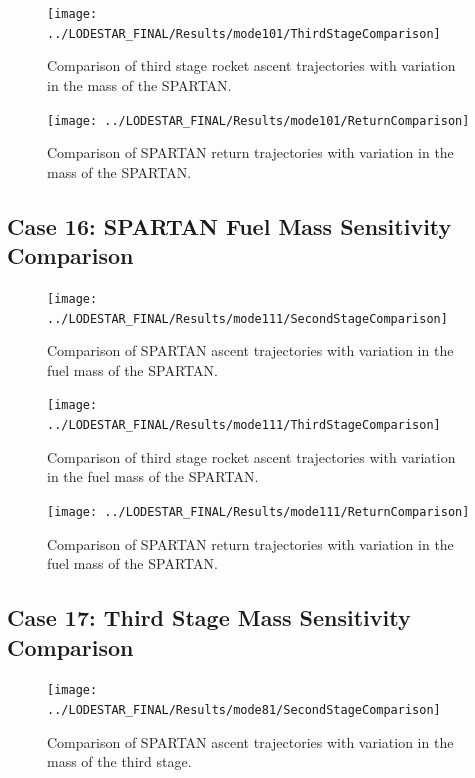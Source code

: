 \begin{figure}[!th]
\centering
\texttt{[image: ../LODESTAR\_FINAL/Results/mode101/ThirdStageComparison]}
\caption{Comparison of third stage rocket ascent trajectories with variation in the mass of the SPARTAN.}
\label{fig:ThirdStageComparison12}
\end{figure}

\begin{figure}[!th]
\centering
\texttt{[image: ../LODESTAR\_FINAL/Results/mode101/ReturnComparison]}
\caption{Comparison of SPARTAN return trajectories with variation in the mass of the SPARTAN.}
\label{fig:ReturnComparison12}
\end{figure}

\FloatBarrier
\clearpage
\subsection{Case 16: SPARTAN Fuel Mass Sensitivity Comparison}\label{sec:app_comparison111}

\begin{figure}[!th]
\centering
\texttt{[image: ../LODESTAR\_FINAL/Results/mode111/SecondStageComparison]}
\caption{Comparison of SPARTAN ascent trajectories with variation in the fuel mass of the SPARTAN.}
\label{fig:SecondStageComparison13}
\end{figure}

\begin{figure}[!th]
\centering
\texttt{[image: ../LODESTAR\_FINAL/Results/mode111/ThirdStageComparison]}
\caption{Comparison of third stage rocket ascent trajectories with variation in the fuel mass of the SPARTAN.}
\label{fig:ThirdStageComparison13}
\end{figure}

\begin{figure}[!th]
\centering
\texttt{[image: ../LODESTAR\_FINAL/Results/mode111/ReturnComparison]}
\caption{Comparison of SPARTAN return trajectories with variation in the fuel mass of the SPARTAN.}
\label{fig:ReturnComparison13}
\end{figure}


\FloatBarrier
\clearpage
\subsection{Case 17: Third Stage Mass Sensitivity Comparison}\label{sec:app_comparison81}
\begin{figure}[!th]
\centering
\texttt{[image: ../LODESTAR\_FINAL/Results/mode81/SecondStageComparison]}
\caption{Comparison of SPARTAN ascent trajectories with variation in the mass of the third stage.}
\label{fig:SecondStageComparison14}
\end{figure}


